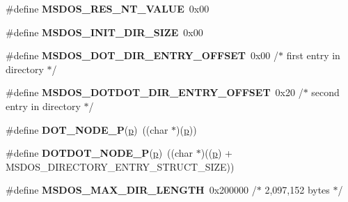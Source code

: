 \begin{DoxyCompactItemize}
\item 
\mbox{\label{group__libfs__msdos_ga867c36f0ff47be1b6769a9f10ae51e18}} 
\#define {\bfseries M\+S\+D\+O\+S\+\_\+\+R\+E\+S\+\_\+\+N\+T\+\_\+\+V\+A\+L\+UE}~0x00
\item 
\mbox{\label{group__libfs__msdos_gaadafb99dbe8b7a7552298f5f17ff5f77}} 
\#define {\bfseries M\+S\+D\+O\+S\+\_\+\+I\+N\+I\+T\+\_\+\+D\+I\+R\+\_\+\+S\+I\+ZE}~0x00
\item 
\mbox{\label{group__libfs__msdos_ga82c296911b7b12e3297c0acb31699965}} 
\#define {\bfseries M\+S\+D\+O\+S\+\_\+\+D\+O\+T\+\_\+\+D\+I\+R\+\_\+\+E\+N\+T\+R\+Y\+\_\+\+O\+F\+F\+S\+ET}~0x00 /$\ast$ first entry in directory $\ast$/
\item 
\mbox{\label{group__libfs__msdos_ga46681284a514d60b0c5517b5e43497c7}} 
\#define {\bfseries M\+S\+D\+O\+S\+\_\+\+D\+O\+T\+D\+O\+T\+\_\+\+D\+I\+R\+\_\+\+E\+N\+T\+R\+Y\+\_\+\+O\+F\+F\+S\+ET}~0x20 /$\ast$ second entry in directory $\ast$/
\item 
\mbox{\label{group__libfs__msdos_ga7008ccebb0362432b88625d40d90246a}} 
\#define {\bfseries D\+O\+T\+\_\+\+N\+O\+D\+E\+\_\+P}(\mbox{\hyperlink{sun4u_2tte_8h_a27952ffc298d15b4fc0e7ee6b2a044ac}{p}})~((char $\ast$)(\mbox{\hyperlink{sun4u_2tte_8h_a27952ffc298d15b4fc0e7ee6b2a044ac}{p}}))
\item 
\mbox{\label{group__libfs__msdos_ga313499314e9771b4d129e016fc2c5500}} 
\#define {\bfseries D\+O\+T\+D\+O\+T\+\_\+\+N\+O\+D\+E\+\_\+P}(\mbox{\hyperlink{sun4u_2tte_8h_a27952ffc298d15b4fc0e7ee6b2a044ac}{p}})~((char $\ast$)((\mbox{\hyperlink{sun4u_2tte_8h_a27952ffc298d15b4fc0e7ee6b2a044ac}{p}}) + M\+S\+D\+O\+S\+\_\+\+D\+I\+R\+E\+C\+T\+O\+R\+Y\+\_\+\+E\+N\+T\+R\+Y\+\_\+\+S\+T\+R\+U\+C\+T\+\_\+\+S\+I\+ZE))
\item 
\mbox{\label{group__libfs__msdos_ga0514d040157aac28638dc935b15eb2bd}} 
\#define {\bfseries M\+S\+D\+O\+S\+\_\+\+M\+A\+X\+\_\+\+D\+I\+R\+\_\+\+L\+E\+N\+G\+TH}~0x200000   /$\ast$ 2,097,152 bytes $\ast$/
\item 
\mbox{\label{group__libfs__msdos_gaba1909e643bab200cacf950cced01e69}} 

\end{DoxyCompactItemize}
